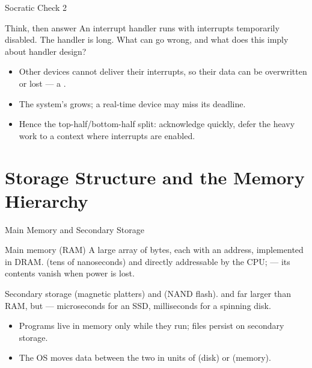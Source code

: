 \documentclass[aspectratio=169]{beamer}
\begin{document}
\begin{frame}{Socratic Check 2}
  \begin{block}{Think, then answer}
    An interrupt handler runs with interrupts temporarily disabled. The handler
    is long. What can go wrong, and what does this imply about handler design?
  \end{block}
  \vspace{0.2cm}
  \begin{itemize}
    \item Other devices cannot deliver their interrupts, so their data can be
      overwritten or lost --- a .
    \item The system's  grows; a real-time device may miss
      its deadline.
    \item Hence the top-half/bottom-half split: acknowledge quickly, defer the
      heavy work to a context where interrupts are enabled.
  \end{itemize}
\end{frame}


\section{Storage Structure and the Memory Hierarchy}

\begin{frame}{Main Memory and Secondary Storage}
  \begin{block}{Main memory (RAM)}
    A large array of bytes, each with an address, implemented in DRAM.
     (tens of nanoseconds) and directly addressable by the CPU;
     --- its contents vanish when power is lost.
  \end{block}
  \begin{block}{Secondary storage}
     (magnetic platters) and 
    (NAND flash).  and far larger than RAM, but
     --- microseconds for an SSD, milliseconds
    for a spinning disk.
  \end{block}
  \vspace{0.15cm}
  \begin{itemize}
    \item Programs live in memory only while they run; files persist on
      secondary storage.
    \item The OS moves data between the two in units of  (disk) or
       (memory).
  \end{itemize}
\end{frame}
\end{document}
